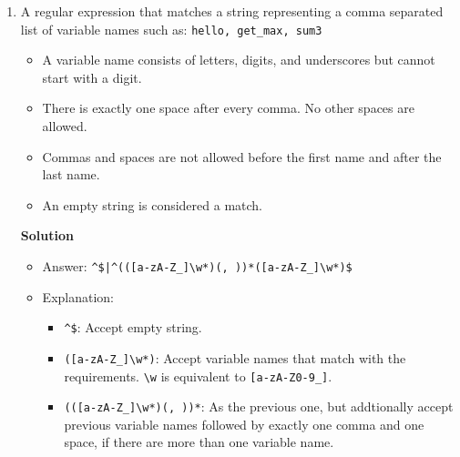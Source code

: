 \documentclass[12pt]{article}
\begin{document}
\begin{enumerate}
    \item A regular expression that matches a string representing a comma separated list of variable names such as: \texttt{hello, get\_max, sum3}

          \begin{itemize}
              \item A variable name consists of letters, digits, and underscores but cannot start with a digit.
              \item There is exactly one space after every comma. No other spaces are allowed.
              \item Commas and spaces are not allowed before the first name and after the last name.
              \item An empty string is considered a match.
          \end{itemize}

        \centerline{\textbf{Solution}}

        \begin{itemize}
            \item Answer: \texttt{\^}\texttt{\$|}\texttt{\^}\texttt{(([a-zA-Z\_]\textbackslash w*)(, ))*([a-zA-Z\_]\textbackslash w*)\$}
            \item Explanation:

            \begin{itemize}
                \item \texttt{\^}\texttt{\$}: Accept empty string.
                \item \texttt{([a-zA-Z\_]\textbackslash w*)}: Accept variable names that match with the requirements. \texttt{\textbackslash w} is equivalent to \texttt{[a-zA-Z0-9\_]}.
                \item \texttt{(([a-zA-Z\_]\textbackslash w*)(, ))*}: As the previous one, but addtionally accept previous variable names followed by exactly one comma and one space, if there are more than one variable name.
            \end{itemize}
        \end{itemize}



\end{enumerate}
\end{document}
